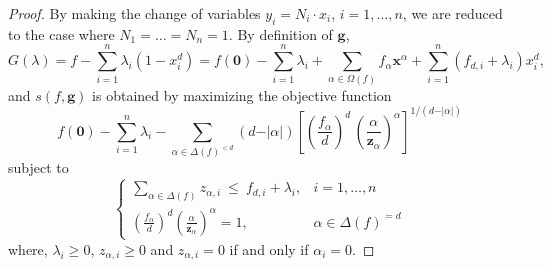 \documentclass{amsart}
\theoremstyle{definition}
\begin{document}
\begin{proof}
By making the change of variables $y_i = N_i\cdot x_i$, $i=1,\dots,n$, we are reduced to the case where $N_1=\dots = N_n=1$.
By definition of $\mathbf{g}$,
%
\[
G(\lambda) = f-\sum_{i=1}^n \lambda_i(1-x_i^d) = f(\mathbf{0})-\sum_{i=1}^n \lambda_i+\sum_{\alpha\in \Omega(f)}f_{\alpha}\mathbf{x}^{\alpha}+\sum_{i=1}^n (f_{d,i}+\lambda_i)x_i^d,
\]
%
and $s(f,\mathbf{g})$ is obtained by maximizing the objective function
%
\begin{equation}\label{obj}
f(\mathbf{0})-\sum_{i=1}^n \lambda_i- \sum_{\alpha\in\Delta(f)^{<d}} (d-\vert\alpha\vert)\left[
\left(\frac{f_\alpha}{d}\right)^{d}\,\left(\frac{\alpha}{\mathbf{z}_\alpha}\right)^\alpha
\right]^{1/(d-\vert\alpha\vert)}
\end{equation}
%
subject to
\begin{equation}\label{lw5}
\left\{
\begin{array}{lr}
	\sum\limits_{\alpha\in\Delta(f)}z_{\alpha,i} \ \le \ f_{d,i}+\lambda_i, & i=1,\ldots,n\\
	 \left(\frac{f_\alpha}{d}\right)^{d}\left(\frac{\alpha}{\mathbf{z}_\alpha}\right)^\alpha  =  1, & \alpha\in\Delta(f)^{=d}
\end{array}\right.
\end{equation}
where, $\lambda_i\ge 0$, $z_{\alpha,i}\ge 0$ and $z_{\alpha,i}= 0$ if and only if $\alpha_i=0$.


\end{proof}
\end{document}
